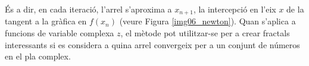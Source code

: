 \documentclass[12pt,a4paper]{report}
\begin{document}
És a dir, en cada iteració, l'arrel s'aproxima a $x_{n+1}$, la intercepció en l'eix $x$ de la tangent a la gràfica en $f(x_{n})$ (veure Figura \ref{img06_newton}). Quan s'aplica a funcions de variable complexa $z$, el mètode pot utilitzar-se per a crear fractals interessants si es considera a quina arrel convergeix per a un conjunt de números en el pla complex.
%
%
\end{document}
